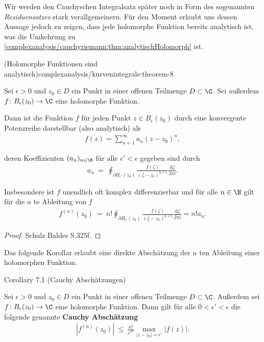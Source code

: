 \documentclass[letterpaper,10pt,german]{jupyterBook}
\begin{document}
\par
Wir werden den Cauchyschen Integralsatz später noch in Form des sogenannten \emph{Residuensatzes} stark verallgemeinern.
Für den Moment erlaubt uns dessen Aussage jedoch zu zeigen, dass jede holomorphe Funktion bereits analytisch ist, was die Umkehrung zu \cref{complexanalysis/cauchyriemann:thm:analytischHolomorph} ist.
\begin{theorem}{(Holomorphe Funktionen sind analytisch)}{complexanalysis/kurvenintegrale:theorem-8}



\par
Sei \(\epsilon > 0\) und \(z_0 \in D\) ein Punkt in einer offenen Teilmenge \(D \subset \C\).
Sei außerdem \(f \colon B_\epsilon(z_0) \rightarrow \C\) eine holomorphe Funktion.

\par
Dann ist die Funktion \(f\) für jeden Punkt \(z \in B_\epsilon(z_0)\) durch eine konvergente Potenzreihe darstellbar (also analytisch) als
\begin{align*}
f(z) = \sum_{n=1}^\infty a_n (z-z_0)^n,
\end{align*}
\par
deren Koeffizienten \((a_n)_{n\in\N}\) für alle \(\epsilon' < \epsilon\) gegeben sind durch
\begin{align*}
a_n \ = \ \oint_{\partial B_{\epsilon'}(z_0)} \frac{f(\zeta)}{(\zeta - z_0)^{n+1}} \frac{\mathrm{d}\zeta}{2\pi i}.
\end{align*}
\par
Insbesondere ist \(f\) unendlich oft komplex differenzierbar und für alle \(n \in \N\) gilt für die \(n\) te Ableitung von \(f\)
\begin{align*}
f^{(n)}(z_0) \ = \ n! \oint_{\partial B_{\epsilon'}(z_0)} \frac{f(\zeta)}{(\zeta - z_0)^{n+1}} \frac{\mathrm{d}\zeta}{2\pi i} = n! a_n.
\end{align*}\end{theorem}

\begin{proof}
 Schulz Baldes S.325f.
\end{proof}

\par
Das folgende Korollar erlaubt eine direkte Abschätzung der \(n\) ten Ableitung einer holomorphen Funktion.
\label{complexanalysis/kurvenintegrale:corollary-9}
\begin{emphBox}{}{}{Corollary 7.1 (Cauchy Abschätzungen)}



\par
Sei \(\epsilon > 0\) und \(z_0 \in D\) ein Punkt in einer offenen Teilmenge \(D \subset \C\).
Außerdem sei \(f \colon B_\epsilon(z_0) \rightarrow \C\) eine holomorphe Funktion.
Dann gilt für alle \(0 < \epsilon' < \epsilon\) die folgende genannte \textbf{Cauchy Abschätzung}
\begin{align*}
|f^{(n)}(z_0)| \ \leq \ \frac{n!}{\epsilon'^n} \max_{|z - z_0|=\epsilon'} |f(z)|.
\end{align*}\end{emphBox}
\end{document}
